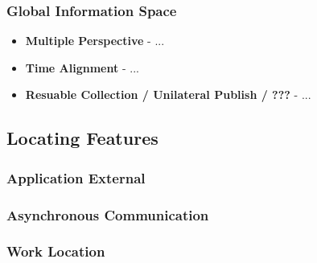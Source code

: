 %
\subsubsection{Global Information Space}
     \begin{itemize}
        \item \textbf{Multiple Perspective} - ...
        \item \textbf{Time Alignment} - ...
        \item \textbf{Resuable Collection / Unilateral Publish / ???} - ...
     \end{itemize}
\subsection{Locating Features}
\subsubsection{Application External}
\subsubsection{Asynchronous Communication}
\subsubsection{Work Location}

